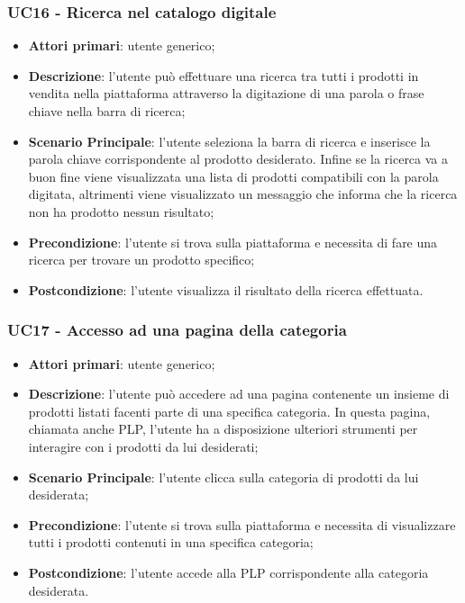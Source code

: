 \subsubsection{UC16 - Ricerca nel catalogo digitale}
\begin{itemize}
\item \textbf{Attori primari}: utente generico;
\item \textbf{Descrizione}: l'utente può effettuare una ricerca tra tutti i prodotti in vendita nella piattaforma attraverso la digitazione di una parola o frase chiave nella barra di ricerca;
\item \textbf{Scenario Principale}: l'utente seleziona la barra di ricerca e inserisce la parola chiave corrispondente al prodotto desiderato. Infine se la ricerca va a buon fine viene visualizzata una lista di prodotti compatibili con la parola digitata, altrimenti viene visualizzato un messaggio che informa che la ricerca non ha prodotto nessun risultato;
\item \textbf{Precondizione}: l'utente si trova sulla piattaforma e necessita di fare una ricerca per trovare un prodotto specifico;
\item \textbf{Postcondizione}: l'utente visualizza il risultato della ricerca effettuata.
\end{itemize}
\subsubsection{UC17 - Accesso ad una pagina della categoria}
\begin{itemize}
\item \textbf{Attori primari}: utente generico;
\item \textbf{Descrizione}: l'utente può accedere ad una pagina contenente un insieme di prodotti listati facenti parte di una specifica categoria. In questa pagina, chiamata anche PLP, l'utente ha a disposizione ulteriori strumenti per interagire con i prodotti da lui desiderati;
\item \textbf{Scenario Principale}: l'utente clicca sulla categoria di prodotti da lui desiderata;
\item \textbf{Precondizione}: l'utente si trova sulla piattaforma e necessita di visualizzare tutti i prodotti contenuti in una specifica categoria;
\item \textbf{Postcondizione}: l'utente accede alla PLP corrispondente alla categoria desiderata.
\end{itemize}